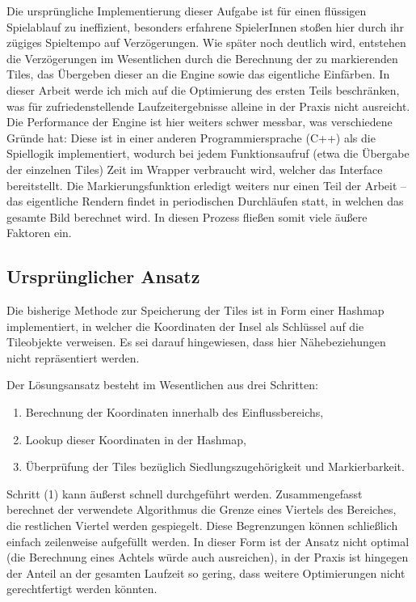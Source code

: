 \documentclass[%
			paper=a4,%
			DIV12,
			liststotoc,
			bibtotoc,
			draft=false,%
			titlepage,
			numbers=noendperiod
			]{scrartcl}
\begin{document}

Die ursprüngliche Implementierung dieser Aufgabe ist für einen flüssigen Spielablauf zu ineffizient, besonders erfahrene SpielerInnen stoßen hier durch ihr zügiges Spieltempo auf Verzögerungen.
Wie später noch deutlich wird, entstehen die Verzögerungen im Wesentlichen durch die Berechnung der zu markierenden Tiles, das Übergeben dieser an die Engine sowie das eigentliche Einfärben. 
In dieser Arbeit werde ich mich auf die Optimierung des ersten Teils beschränken, was für zufriedenstellende Laufzeitergebnisse alleine in der Praxis nicht ausreicht.
Die Performance der Engine ist hier weiters schwer messbar, was verschiedene Gründe hat:
Diese ist in einer anderen Programmiersprache (C++) als die Spiellogik implementiert, wodurch bei jedem Funktionsaufruf (etwa die Übergabe der einzelnen Tiles) Zeit im Wrapper verbraucht wird, welcher das Interface bereitstellt.
Die Markierungsfunktion erledigt weiters nur einen Teil der Arbeit -- das eigentliche Rendern findet in periodischen Durchläufen statt, in welchen das gesamte Bild berechnet wird.
In diesen Prozess fließen somit viele äußere Faktoren ein. 

\subsection{Ursprünglicher Ansatz}

Die bisherige Methode zur Speicherung der Tiles ist in Form einer Hashmap implementiert, in welcher die Koordinaten der Insel als Schlüssel auf die Tileobjekte verweisen. 
Es sei darauf hingewiesen, dass hier Nähebeziehungen nicht repräsentiert werden.

Der Lösungsansatz besteht im Wesentlichen aus drei Schritten:
\begin{enumerate}
	\item Berechnung der Koordinaten innerhalb des Einflussbereichs,
	\item Lookup dieser Koordinaten in der Hashmap,
	\item Überprüfung der Tiles bezüglich Siedlungszugehörigkeit und Markierbarkeit.
\end{enumerate}

Schritt (1) kann äußerst schnell durchgeführt werden.
Zusammengefasst berechnet der verwendete Algorithmus die Grenze eines Viertels des Bereiches, die restlichen Viertel werden gespiegelt.
Diese Begrenzungen können schließlich einfach zeilenweise aufgefüllt werden.
In dieser Form ist der Ansatz nicht optimal (die Berechnung eines Achtels würde auch \mbox{ausreichen}), in der Praxis ist hingegen der Anteil an der gesamten Laufzeit so gering, dass weitere Optimierungen nicht gerechtfertigt werden könnten.
\end{document}
